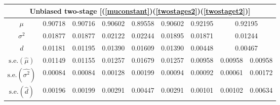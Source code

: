 \documentclass[11pt,a5paper,twoside]{book}
\begin{document}
\begin{table}[t!]
\begin{center}
{\begin{tabular}{ccccccccc}
\hline\hline
\multicolumn{9}{c}{{Unbiased two-stage [(\ref{muconstant})(\ref{twostages2})(\ref{twostaget2})]}}\\
\hline
$\mu$ & 0.90718 & 0.90716 & 0.90602 & 0.89558 & 0.90602 & 0.92195 & \multicolumn{2}{c}{0.92195}  \\
$\sigma^2$ & 0.01877 & 0.01877 & 0.02122 & 0.02244 & 0.01895 & 0.01871 & \multicolumn{2}{c}{0.01244}  \\
$d$ & 0.01181 & 0.01195 & 0.01390 & 0.01609 & 0.01390 & 0.00448 & \multicolumn{2}{c}{0.00467}  \\

\hline
$\mbox{s.e.}(\widehat{\mu})$& 0.01149 & 0.01155 & 0.01257 & 0.01679 & 0.01257 & 0.00958 & 0.00958 & 0.00958 \\
$\mbox{s.e.}(\widehat{\sigma^2})$  & 0.00084 & 0.00084 & 0.00128 & 0.00199 & 0.00094 & 0.00092 & 0.00061 & 0.00172 \\
  $\mbox{s.e.}(\widehat{d})$ & 0.00196 & 0.00199 & 0.00291 & 0.00447 & 0.00291 & 0.00101 & 0.00102 & 0.00634 \\

\hline\hline
\end{tabular}}
\end{center}
\end{table}



\end{document}
